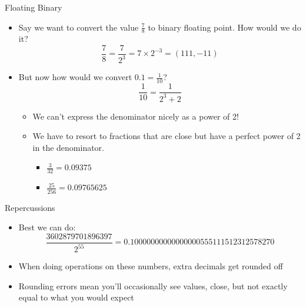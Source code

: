\documentclass[pdf, aspectratio=169, 12pt]{beamer}
\begin{document}
\begin{frame}{Floating Binary}
	\vspace{5mm}
	\begin{itemize}
		\item Say we want to convert the value $\tfrac{7}{8}$ to binary floating point. How would we do it?
			\pause
			\[\frac{7}{8} = \frac{7}{2^3} = 7\times2^{-3} = (111,-11)\]
		\pause
		\item But now how would we convert $0.1 = \tfrac{1}{10}$?
			\pause
			\[\frac{1}{10} = \frac{1}{2^3 + 2}\]
			\pause
			\begin{itemize}
				\item We can't express the denominator nicely as a power of 2!
				\item We have to resort to fractions that are close but have a perfect power of 2 in the denominator.
					\begin{itemize}
						\item $\tfrac{3}{32} = 0.09375$
							\vspace{1mm}
						\item $\tfrac{25}{256} = 0.09765625$
					\end{itemize}
			\end{itemize}
	\end{itemize}
\end{frame}

\begin{frame}{Repercussions}
	\begin{itemize}
		\item Best we can do:
			\[\frac{3602879701896397}{2^{55}} = 0.10000000000000000555111512312578270\]
		\item When doing operations on these numbers, extra decimals get rounded off
		\item Rounding errors mean you'll occasionally see values, close, but not exactly equal to what you would expect
	\end{itemize}
\end{frame}
\end{document}
